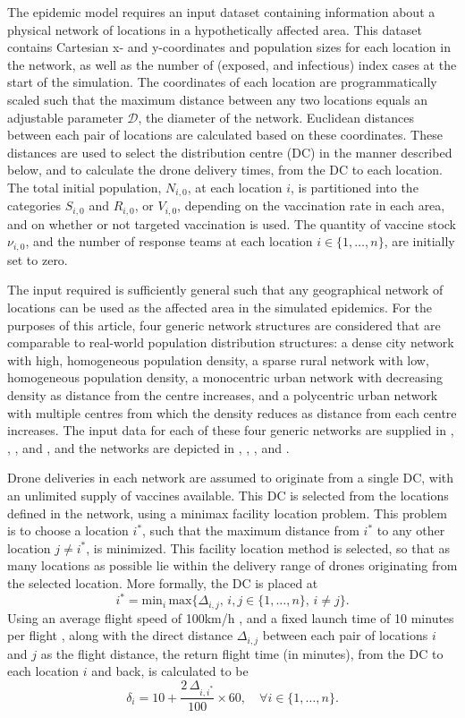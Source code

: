\documentclass[10pt,letterpaper]{article}
\begin{document}
The epidemic model requires an input dataset containing information about a physical network of locations in a hypothetically affected area. This dataset contains Cartesian x- and y-coordinates and population sizes for each location in the network, as well as the number of (exposed, and infectious) index cases at the start of the simulation. The coordinates of each location are programmatically scaled such that the maximum distance between any two locations equals an adjustable parameter $\mathcal{D}$, the diameter of the network. Euclidean distances between each pair of locations are calculated based on these coordinates. These distances are used to select the distribution centre (DC) in the manner described below, and to calculate the drone delivery times, from the DC to each location. The total initial population, $N_{i,0}$, at each location $i$, is partitioned into the categories $S_{i,0}$ and $R_{i,0}$, or $V_{i,0}$, depending on the vaccination rate in each area, and on whether or not targeted vaccination is used. The quantity of vaccine stock $\nu_{i,0}$, and the number of response teams at each location $i \in \{1,\dots,n\}$, are initially set to zero.

The input required is sufficiently general such that any geographical network of locations can be used as the affected area in the simulated epidemics. For the purposes of this article, four generic network structures are considered that are comparable to real-world population distribution structures: a dense city network with high, homogeneous population density, a sparse rural network with low, homogeneous population density, a monocentric urban network with decreasing density as distance from the centre increases, and a polycentric urban network with multiple centres from which the density reduces as distance from each centre increases. The input data for each of these four generic networks are supplied in , , , and , and the networks are depicted in , , , and . 

Drone deliveries in each network are assumed to originate from a single DC, with an unlimited supply of vaccines available. This DC is selected from the locations defined in the network, using a minimax facility location problem. This problem is to choose a location $i^{*}$, such that the maximum distance from $i^{*}$ to any other location $j \neq i^{*}$, is minimized. This facility location method is selected, so that as many locations as possible lie within the delivery range of drones originating from the selected location. More formally, the DC is placed at $$i^{*} = \text{min}_{i} \, \text{max} \{\Delta_{i,j}, \, i, j \in \{1,\ldots,n\}, \, i \neq j\}.$$
Using an average flight speed of 100km/h \cite{zipline_impact}, and a fixed launch time of 10 minutes per flight \cite{ackerman_koziol_2019}, along with the direct distance $\Delta_{i,j}$ between each pair of locations $i$ and $j$ as the flight distance, the return flight time (in minutes), from the DC to each location $i$ and back, is calculated to be $$\delta_{i} = 10 + \frac{2 \, \Delta_{i,i^{*}}}{100} \times 60, \quad \forall{i} \in \{1, \dots, n \}.$$ 
\end{document}
